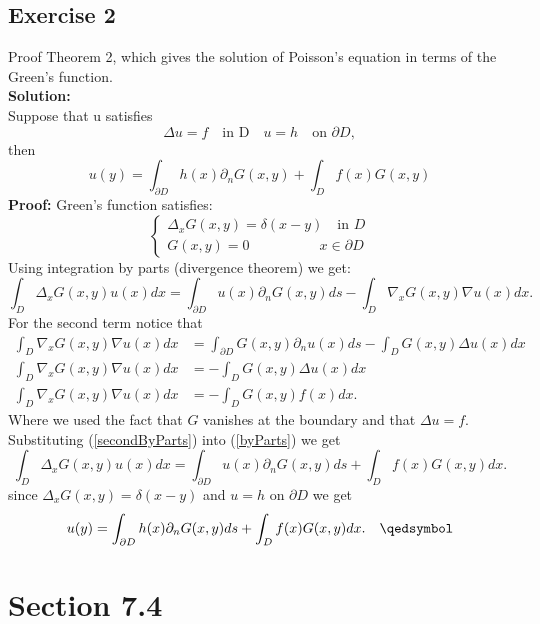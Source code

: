 \documentclass[12pt]{article}%
\begin{document}
\subsection*{Exercise 2}
Proof Theorem 2, which gives the solution of Poisson's equation in terms of the
Green's function.\\
\textbf{Solution:}\\
Suppose that u satisfies
\[
    \Delta u =f \quad \text{in D} \quad u=h \quad \text{on }\partial D,
\]
then
\[
    u(y)=\int_{\partial D}h(x)\partial_nG(x,y) + \int_D f(x)G(x,y)
\]
\textbf{Proof:}
Green's function satisfies:
\[
\begin{cases}
    \Delta_xG(x,y)=\delta(x-y) \quad \text{in } D\\
    G(x,y)=0 \qquad\qquad\quad x\in \partial D
\end{cases}
\]
Using integration by parts (divergence theorem) we get:
\begin{equation}\label{byParts}
    \int_D \Delta_x G(x,y)u(x)dx=\int_{\partial D} u(x)\partial_nG(x,y)ds - \int_D \nabla_xG(x,y)\nabla u(x)dx.
\end{equation}
For the second term notice that
\begin{align} \label{secondByParts}
    \int_D \nabla_xG(x,y)\nabla u(x)dx&=\int_{\partial D}G(x,y)\partial_nu(x)ds - \int_D G(x,y)\Delta u(x)dx \nonumber\\
    \int_D \nabla_xG(x,y)\nabla u(x)dx&=- \int_D G(x,y)\Delta u(x)dx \nonumber\\
    \int_D \nabla_xG(x,y)\nabla u(x)dx&=- \int_D G(x,y)f(x)dx.
\end{align}
Where we used the fact that $G$ vanishes at the boundary and that $\Delta u =f$.
Substituting (\ref{secondByParts}) into (\ref{byParts}) we get
\[
    \int_D \Delta_x G(x,y)u(x)dx=\int_{\partial D} u(x)\partial_nG(x,y)ds + \int_D f(x)G(x,y)dx.
\]
since $\Delta_xG(x,y)=\delta(x-y)$ and $u=h$ on $\partial D$ we get
\[
    u(y)=\int_{\partial D} h(x)\partial_nG(x,y)ds + \int_D f(x)G(x,y)dx. \quad \qedsymbol
\]
\section*{Section 7.4}
\end{document}
